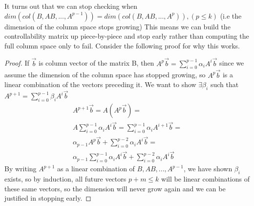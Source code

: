 \documentclass{article}
\newtheorem{proof}{Proof}
\begin{document}
It turns out that we can stop checking when $dim(col(B, AB,...,A^{p-1}))=dim(col(B, AB, ..., A^p)), (p \leq k)$ (i.e the dimension of the column space stops growing)
This means we can build the controllability matrix up piece-by-piece and stop early rather than computing the full column space only to fail. Consider the following proof for why this works.
\begin{proof}
    If $\vec{b}$ is column vector of the matrix B, then $A^p \vec{b}=\sum_{i=0}^{p-1}{\alpha_iA^i\vec{b}}$ since we assume the dimension of the column space has stopped growing,
    so $A^p\vec{b}$ is a linear combination of the vectors preceding it.
    We want to show $\exists \beta_i$ such that $A^{p+1}=\sum_{i=0}^{p-1}{\beta_iA^i\vec{b}}$
    \[
        \begin{array}{c}
            A^{p+1}\vec{b}=A(A^p\vec{b}) =\\
            A\sum_{i=0}^{p-1}{\alpha_iA^i\vec{b}} = \sum_{i=0}^{p-1}{\alpha_iA^{i+1}\vec{b}}=\\
            \alpha_{p-1}A^p\vec{b}+ \sum_{i=0}^{p-2}{\alpha_iA^{i}\vec{b}}=\\
            \alpha_{p-1}\sum_{i=0}^{p-1}{\alpha_iA^i\vec{b}}+\sum_{i=0}^{p-2}{\alpha_iA^{i}\vec{b}}
        \end{array}
        \]
    By writing $A^{p+1}$ as a linear combination of $B, AB,...,A^{p-1}$, we have shown $\beta_i$ exists, so by induction, all future vectors $p+m\leq k$ will be linear combinations of these same vectors, 
    so the dimension will never grow again and we can be justified in stopping early.
\end{proof}
\end{document}
